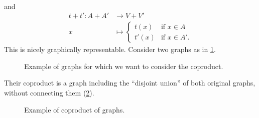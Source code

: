 \begin{example}
\begin{equation*}
\begin{aligned}
        \end{aligned}
        \end{equation*}
and
\begin{equation*}
        \begin{aligned}
            t+t'\colon A+ A'&\to V+ V'\\
            x&\mapsto
                \begin{cases}
                   t(x)& \text{if } x\in A\\
                    t'(x)&\text{if } x\in A'.
                    \end{cases}
        \end{aligned}
\end{equation*}
This is nicely graphically representable. Consider two graphs as in \cref{fig:graphs_1}.

\begin{figure}[h!]
    \centering
    \caption{Example of graphs for which we want to consider the coproduct. \label{fig:graphs_1}}
\end{figure}

Their coproduct is a graph including the ``disjoint union'' of both original graphs, without connecting them (\cref{fig:graphs_2}).



\begin{figure}[h!]
    \centering
    \caption{Example of coproduct of graphs. \label{fig:graphs_2}}
\end{figure}

\end{example}
